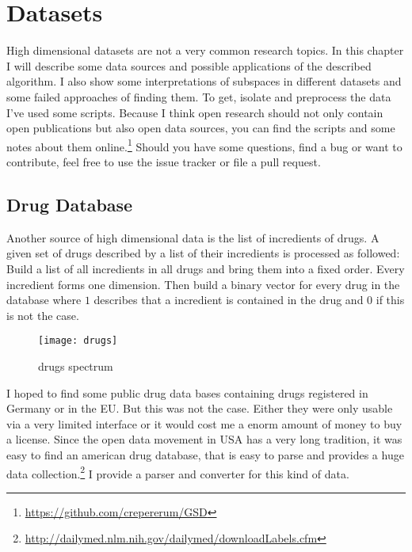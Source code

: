 \chapter{Datasets}
High dimensional datasets are not a very common research topics. In this chapter I will describe some data sources and possible applications of the described algorithm. I also show some interpretations of subspaces in different datasets and some failed approaches of finding them. To get, isolate and preprocess the data I've used some scripts. Because I think open research should not only contain open publications but also open data sources, you can find the scripts and some notes about them online.\footnote{\url{https://github.com/crepererum/GSD}} Should you have some questions, find a bug or want to contribute, feel free to use the issue tracker or file a pull request.

\section{Drug Database}
Another source of high dimensional data is the list of incredients of drugs. A given set of drugs described by a list of their incredients is processed as followed: Build a list of all incredients in all drugs and bring them into a fixed order. Every incredient forms one dimension. Then build a binary vector for every drug in the database where $1$ describes that a incredient is contained in the drug and $0$ if this is not the case.
\begin{figure}
	\texttt{[image: drugs]}
	\caption{drugs spectrum}
	\label{fig:drugs}
\end{figure}
I hoped to find some public drug data bases containing drugs registered in Germany or in the EU. But this was not the case. Either they were only usable via a very limited interface or it would cost me a enorm amount of money to buy a license. Since the open data movement in USA has a very long tradition, it was easy to find an american drug database, that is easy to parse and provides a huge data collection.\footnote{\url{http://dailymed.nlm.nih.gov/dailymed/downloadLabels.cfm}} I provide a parser and converter for this kind of data.

